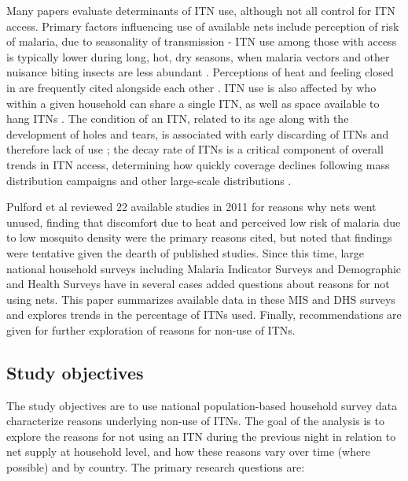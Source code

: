 \documentclass[review,
3p]{elsarticle} %
\begin{document}
Many papers evaluate determinants of ITN use, although not all control
for ITN access. Primary factors influencing use of available nets
include perception of risk of malaria, due to seasonality of
transmission - ITN use among those with access is typically lower during
long, hot, dry seasons, when malaria vectors and other nuisance biting
insects are less abundant \citep{Koenker:2019id}. Perceptions of heat
and feeling closed in are frequently cited alongside each other
\citep{Pulford:2011dc, Ahorlu:2019ck}. ITN use is also affected by who
within a given household can share a single ITN, as well as space
available to hang ITNs
\citep{Toe:2009gb, Lam:2014fc, Galvin:2011ea, 10.1186/s12936-021-03705-2}.
The condition of an ITN, related to its age along with the development
of holes and tears, is associated with early discarding of ITNs and
therefore lack of use
\citep{10.1186/s12936-022-04126-5, 10.1371/journal.pmed.1003248, 10.1186/s12936-021-03686-2, 10.1186/s12936-021-03976-9};
the decay rate of ITNs is a critical component of overall trends in ITN
access, determining how quickly coverage declines following mass
distribution campaigns and other large-scale distributions
\citep{Bhatt:2015gn, 10.1038/s41467-021-23707-7}.

Pulford et al \citep{Pulford:2011dc} reviewed 22 available studies in
2011 for reasons why nets went unused, finding that discomfort due to
heat and perceived low risk of malaria due to low mosquito density were
the primary reasons cited, but noted that findings were tentative given
the dearth of published studies. Since this time, large national
household surveys including Malaria Indicator Surveys and Demographic
and Health Surveys have in several cases added questions about reasons
for not using nets. This paper summarizes available data in these MIS
and DHS surveys and explores trends in the percentage of ITNs used.
Finally, recommendations are given for further exploration of reasons
for non-use of ITNs.

\hypertarget{study-objectives}{%
\subsection{Study objectives}\label{study-objectives}}

The study objectives are to use national population-based household
survey data characterize reasons underlying non-use of ITNs. The goal of
the analysis is to explore the reasons for not using an ITN during the
previous night in relation to net supply at household level, and how
these reasons vary over time (where possible) and by country. The
primary research questions are:
\end{document}
